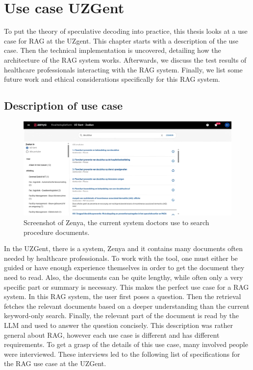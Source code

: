 
\chapter{Use case UZGent}
\label{sec:use_case_uzgent}
To put the theory of speculative decoding into practice, this thesis looks at a use case for RAG at the UZgent. This chapter starts with a description of the use case. Then the technical implementation is uncovered, detailing how the architecture of the RAG system works. Afterwards, we discuss the test results of healthcare professionals interacting with the RAG system. Finally, we list some future work and ethical considerations specifically for this RAG system.

\section{Description of use case}

\begin{figure}[h]
	\centering
	\includegraphics[width=\linewidth]{fig/zenya.png}
	\caption{Screenshot of Zenya, the current system doctors use to search procedure documents.}
	\label{fig:zenya}
\end{figure}

In the UZGent, there is a system, Zenya and it contains many documents often needed by healthcare professionals. To work with the tool, one must either be guided or have enough experience themselves in order to get the document they need to read. Also, the documents can be quite lengthy, while often only a very specific part or summary is necessary. This makes the perfect use case for a RAG system. In this RAG system, the user first poses a question. Then the retrieval fetches the relevant documents based on a deeper understanding than the current keyword-only search. Finally, the relevant part of the document is read by the LLM and used to answer the question concisely. This description was rather general about RAG, however each use case is different and has different requirements. To get a grasp of the details of this use case, many involved people were interviewed. These interviews led to the following list of specifications for the RAG use case at the UZGent.

